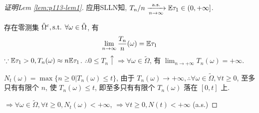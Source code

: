 \begin{proof}[证明Lem \ref{lem:p113-lem1}]
    应用SLLN知, $T_n/n\xrightarrow[n\to\infty]{\text{a.s.}}\mathbb E \tau_1\in (0,+\infty]$.

    存在零测集 $\tilde{\Omega}^c,\text{s.t. } \forall \omega \in \tilde{\Omega}$, 有
    \[
    \lim_{n\to\infty}\frac{T_n}{n}(\omega)=\mathbb E \tau_1
    \]
    $\because \mathbb E \tau_1>0, T_n(\omega)\approx n\mathbb E \tau_1$. $\therefore 0\leq T_n\uparrow\Rightarrow \forall \omega\in\tilde{\Omega}$, 有 $\lim_{n\to +\infty}T_n(\omega)=+\infty$. 
    
    $N_t(\omega)=\max\{n\geq 0|T_n(\omega)\leq t\}$, 由于 $T_n(\omega)\to +\infty, \therefore \forall \omega\in\tilde{\Omega},\forall t\geq 0$, 至多只有有限个 $n$, 使 $T_n(\omega)\leq t$, 即至多只有有限个 $T_n(\omega)$ 落在 $[0,t]$ 上.

    $\Rightarrow \forall \omega\in\tilde{\Omega},\forall t\geq 0, N_t(\omega)<+\infty$, $\Rightarrow \forall t\geq 0,N(t)<+\infty$ (a.s.)
\end{proof}
\newpage